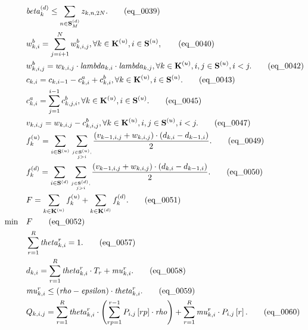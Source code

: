 \begin{align}
  & \mathit{beta}_{k}^{\left(d\right)} \leq \sum_{n \in \mathbf{S}_{M}^{\left(d\right)}} z_{k , n , 2 N} . \tag{eq\_0039} \\
  & w_{k , i}^{b} = \sum_{j = i + 1}^{N} w_{k , i , j}^{b} , \forall k \in \mathbf{K}^{\left(u\right)} , i \in \mathbf{S}^{\left(u\right)} , \tag{eq\_0040} \\
  & w_{k , i , j}^{b} = w_{k , i , j} \cdot \mathit{lambda}_{k , i} \cdot \mathit{lambda}_{k , j} , \forall k \in \mathbf{K}^{\left(u\right)} , i , j \in \mathbf{S}^{\left(u\right)} , i < j . \tag{eq\_0042} \\
  & c_{k , i} = c_{k , i - 1} - c_{k , i}^{a} + c_{k , i}^{b} , \forall k \in \mathbf{K}^{\left(u\right)} , i \in \mathbf{S}^{\left(u\right)} . \tag{eq\_0043} \\
  & c_{k , i}^{a} = \sum_{j = 1}^{i - 1} c_{k , j , i}^{b} , \forall k \in \mathbf{K}^{\left(u\right)} , i \in \mathbf{S}^{\left(u\right)} . \tag{eq\_0045} \\
  & v_{k , i , j} = w_{k , i , j} - c_{k , i , j}^{b} , \forall k \in \mathbf{K}^{\left(u\right)} , i , j \in \mathbf{S}^{\left(u\right)} , i < j . \tag{eq\_0047} \\
  & f_{k}^{\left(u\right)} = \sum_{i \in \mathbf{S}^{\left(u\right)}} \underset{\genfrac{}{}{0pt}{}{j \in \mathbf{S}^{\left(u\right)} ,}{j > i}}{\sum} \frac{\left(v_{k - 1 , i , j} + w_{k , i , j}\right) \cdot \left(d_{k , i} - d_{k - 1 , i}\right)}{2} . \tag{eq\_0049} \\
  & f_{k}^{\left(d\right)} = \sum_{i \in \mathbf{S}^{\left(d\right)}} \underset{\genfrac{}{}{0pt}{}{j \in \mathbf{S}^{\left(d\right)} ,}{j > i}}{\sum} \frac{\left(v_{k - 1 , i , j} + w_{k , i , j}\right) \cdot \left(d_{k , i} - d_{k - 1 , i}\right)}{2} . \tag{eq\_0050} \\
  & F = \sum_{k \in \mathbf{K}^{\left(u\right)}} f_{k}^{\left(u\right)} + \sum_{k \in \mathbf{K}^{\left(d\right)}} f_{k}^{\left(d\right)} . \tag{eq\_0051} \\
  \min\quad & F \tag{eq\_0052} \\
  & \sum_{r = 1}^{R} \mathit{theta}_{k , i}^{r} = 1 . \tag{eq\_0057} \\
  & d_{k , i} = \sum_{r = 1}^{R} \mathit{theta}_{k , i}^{r} \cdot T_{r} + \mathit{mu}_{k , i}^{r} . \tag{eq\_0058} \\
  & \mathit{mu}_{k , i}^{r} \leq \left(\mathit{rho} - \mathit{epsilon}\right) \cdot \mathit{theta}_{k , i}^{r} . \tag{eq\_0059} \\
  & Q_{k , i , j} = \sum_{r = 1}^{R} \mathit{theta}_{k , i}^{r} \cdot \left(\sum_{rp = 1}^{r - 1} P_{i , j} \left[rp\right] \cdot \mathit{rho}\right) + \sum_{r = 1}^{R} \mathit{mu}_{k , i}^{r} \cdot P_{i , j} \left[r\right] . \tag{eq\_0060} \\

\end{align}
